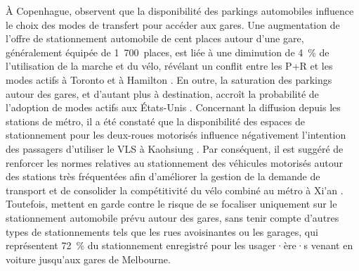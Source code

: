 \begin{refsegment}
À Copenhague, \textcolor{blue}{\textcite[18]{halldorsdottir_home-end_2017}} observent que la disponibilité des parkings automobiles influence le choix des modes de transfert pour accéder aux gares. Une augmentation de l'offre de stationnement automobile de cent places autour d'une gare, généralement équipée de 1~700~places, est liée à une diminution de 4~\% de l'utilisation de la marche et du vélo, révélant un conflit entre les \acrfull{P+R} et les \gls{modes actifs} à Toronto et à Hamilton \textcolor{blue}{\autocite[2172-2173]{chan_factors_2020}}. En outre, la saturation des parkings autour des gares, et d'autant plus à destination, accroît la probabilité de l'adoption de modes actifs aux États-Unis \textcolor{blue}{\autocite[4270]{bopp_examining_2015}}. Concernant la diffusion depuis les stations de métro, il a été constaté que la disponibilité des espaces de stationnement pour les deux-roues motorisés influence négativement l'intention des passagers d'utiliser le \acrshort{VLS} à Kaohsiung \textcolor{blue}{\autocite[28]{cheng_expanding_2018}}. Par conséquent, il est suggéré de renforcer les normes relatives au stationnement des véhicules motorisés autour des stations très fréquentées afin d'améliorer la gestion de la demande de transport et de consolider la compétitivité du vélo combiné au métro à Xi'an \textcolor{blue}{\autocite[7]{zhu_improved_2021}}. Toutefois, \textcolor{blue}{\textcite[401]{weliwitiya_bicycle_2019}} mettent en garde contre le risque de se focaliser uniquement sur le stationnement automobile prévu autour des gares, sans tenir compte d'autres types de stationnements tels que les rues avoisinantes ou les garages, qui représentent 72~\% du stationnement enregistré pour les usager·ère·s venant en voiture jusqu'aux gares de Melbourne.%


\end{refsegment}
